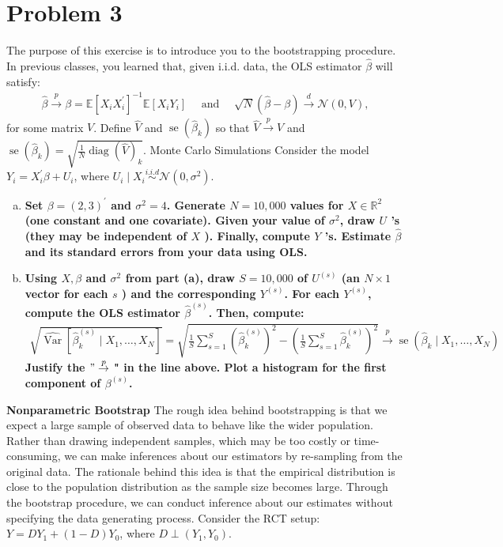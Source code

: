 \documentclass{article}
\begin{document}
\section*{Problem 3}
The purpose of this exercise is to introduce you to the bootstrapping procedure. In previous classes, you learned that, given i.i.d. data, the OLS estimator $\hat{\beta}$ will satisfy:
\begin{align*}
\hat{\beta} \stackrel{p}{\rightarrow} \beta=\mathbb{E}\left[X_{i} X_{i}^{\prime}\right]^{-1} \mathbb{E}\left[X_{i} Y_{i}\right] \quad \text { and } \quad \sqrt{N}(\hat{\beta}-\beta) \stackrel{d}{\rightarrow} \mathcal{N}(0, V),
\end{align*}
for some matrix $V$. Define $\hat{V}$ and $\operatorname{se}\left(\hat{\beta}_{k}\right)$ so that $\hat{V} \stackrel{p}{\rightarrow} V$ and $\operatorname{se}\left(\hat{\beta}_{k}\right)=\sqrt{\frac{1}{N} \operatorname{diag}(\hat{V})_{k}}$.
Monte Carlo Simulations
Consider the model $Y_{i}=X_{i}^{\prime} \beta+U_{i}$, where $U_{i} \mid X_{i} \stackrel{i . i . d}{\sim} \mathcal{N}\left(0, \sigma^{2}\right)$.
\begin{enumerate}[(a), wide, labelwidth=!, labelindent=0pt]
    \item \textbf{Set $\beta=(2,3)^{\prime}$ and $\sigma^{2}=4$. Generate $N=10,000$ values for $X \in \mathbb{R}^{2}$ (one constant and one covariate). Given your value of $\sigma^{2}$, draw $U$ 's (they may be independent of $X$ ). Finally, compute $Y$ 's. Estimate $\hat{\beta}$ and its standard errors from your data using OLS.}
    \item \textbf{Using $X, \beta$ and $\sigma^{2}$ from part (a), draw $S=10,000$ of $U^{(s)}$ (an $N \times 1$ vector for each $s$ ) and the corresponding $Y^{(s)}$. For each $Y^{(s)}$, compute the OLS estimator $\hat{\beta}^{(s)}$. Then, compute:
    \begin{align*}
        \sqrt{\widehat{\operatorname{Var}}\left[\hat{\beta}_{k}^{(s)} \mid X_{1}, \ldots, X_{N}\right]}=\sqrt{\frac{1}{S} \sum_{s=1}^{S}\left(\hat{\beta}_{k}^{(s)}\right)^{2}-\left(\frac{1}{S} \sum_{s=1}^{S} \hat{\beta}_{k}^{(s)}\right)^{2}} \stackrel{p}{\rightarrow} \operatorname{se}\left(\hat{\beta}_{k} \mid X_{1}, \ldots, X_{N}\right)
    \end{align*}
    Justify the $" \stackrel{p}{\rightarrow}$ " in the line above. Plot a histogram for the first component of $\beta^{(s)}$.}
\end{enumerate}
\textbf{Nonparametric Bootstrap}
The rough idea behind bootstrapping is that we expect a large sample of observed data to behave like the wider population. Rather than drawing independent samples, which may be too costly or time-consuming, we can make inferences about our estimators by re-sampling from the original data. The rationale behind this idea is that the empirical distribution is close to the population distribution as the sample size becomes large. Through the bootstrap procedure, we can conduct inference about our estimates without specifying the data generating process. Consider the RCT setup: $Y=D Y_{1}+(1-D) Y_{0}$, where $D \perp\left(Y_{1}, Y_{0}\right)$.
\end{document}
